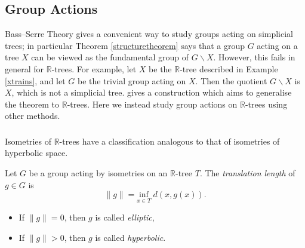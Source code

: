 \subsection{Group Actions}
Bass--Serre Theory gives a convenient way to study groups acting on simplicial trees; in particular Theorem \ref{structuretheorem} says that a group $G$ acting on a tree $X$ can be viewed as the fundamental group of $G\backslash X$. However, this fails in general for $\mathbb{R}$-trees. For example, let $X$ be the $\mathbb{R}$-tree described in Example \ref{xtrains}, and let $G$ be the trivial group acting on $X$. Then the quotient $G\backslash X$ is $X$, which is not a simplicial tree. \cite{Levit_rtrees} gives a construction which aims to generalise the theorem to $\mathbb{R}$-trees. Here we instead study group actions on $\mathbb{R}$-trees using other methods.

\subsubsection{} 
Isometries of $\mathbb{R}$-trees have a classification analogous to that of isometries of hyperbolic space. 
\begin{definition}
    Let $G$ be a group acting by isometries on an $\mathbb{R}$-tree $T$. The \emph{translation length} of $g\in G$ is \[\lVert g\rVert=\underset{x\in T}{\text{inf}}\;d(x,g(x)).\]
    \begin{itemize}
        \item If $\lVert g\rVert=0$, then $g$ is called \emph{elliptic},
        \item If $\lVert g\rVert>0$, then $g$ is called \emph{hyperbolic}.
    \end{itemize}
\end{definition}

